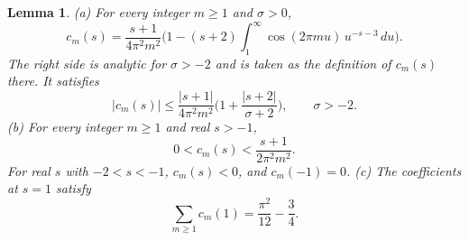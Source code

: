 \documentclass[11pt,reqno]{amsart}
\numberwithin{equation}{section}
\theoremstyle{plain}
\newtheorem{lemma}[theorem]{Lemma}
\theoremstyle{definition}
\theoremstyle{remark}
\begin{document}
\begin{lemma}\label{lem:cm}
(a) For every integer $m\ge1$ and $\sigma>0$,
\begin{equation}\label{eq:cmparts}
c_m(s)=\frac{s+1}{4\pi^2m^2}\Big(1-(s+2)\int_1^\infty\cos(2\pi mu)\,u^{-s-3}\,du\Big).
\end{equation}
The right side is analytic for $\sigma>-2$ and is taken as the definition of $c_m(s)$ there. It satisfies
\begin{equation}\label{eq:cmbound}
|c_m(s)|\le\frac{|s+1|}{4\pi^2m^2}\Big(1+\frac{|s+2|}{\sigma+2}\Big),\qquad\sigma>-2 .
\end{equation}
(b) For every integer $m\ge1$ and real $s>-1$,
\begin{equation}\label{eq:cmpos}
0<c_m(s)<\frac{s+1}{2\pi^2m^2} .
\end{equation}
For real $s$ with $-2<s<-1$, $c_m(s)<0$, and $c_m(-1)=0$.
(c) The coefficients at $s=1$ satisfy
\begin{equation}\label{eq:sumcm}
\sum_{m\ge1}c_m(1)=\frac{\pi^2}{12}-\frac34 .
\end{equation}
\end{lemma}
\end{document}
